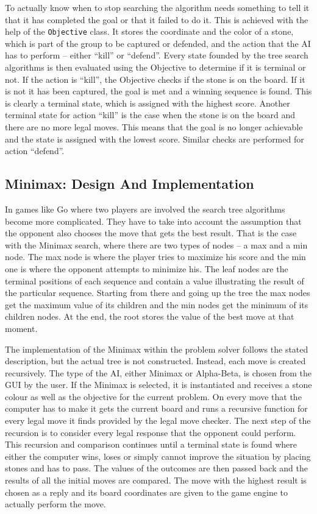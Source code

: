 \documentclass{l3proj}
\begin{document}
To actually know when to stop searching the algorithm needs something to tell it that it has completed the goal or that it failed to do it. This is achieved with the help of the \texttt{Objective} class. It stores the coordinate and the color of a stone, which is part of the group to be captured or defended, and the action that the AI has to perform – either “kill” or “defend”. Every state founded by the tree search algorithms is then evaluated using the Objective to determine if it is terminal or not. If the action is “kill”, the Objective checks if the stone is on the board. If it is not it has been captured, the goal is met and a winning sequence is found. This is clearly a terminal state, which is assigned with the highest score. Another terminal state for action “kill” is the case when the stone is on the board and there are no more legal moves. This means that the goal is no longer achievable and the state is assigned with the lowest score. Similar checks are performed for action “defend”.

\subsection{Minimax: Design And Implementation}

In games like Go where two players are involved the search tree algorithms become more complicated. They have to take into account the assumption that the opponent also chooses the move that gets the best result. That is the case with the Minimax search, where there are two types of nodes – a max and a min node. The max node is where the player tries to maximize his score and the min one is where the opponent attempts to minimize his. The leaf nodes are the terminal positions of each sequence and contain a value illustrating the result of the particular sequence. Starting from there and going up the tree the max nodes get the maximum value of its children and the min nodes get the minimum of its children nodes. At the end, the root stores the value of the best move at that moment.  

The implementation of the Minimax within the problem solver follows the stated description, but the actual tree is not constructed. Instead, each move is created recursively. The type of the AI, either Minimax or Alpha-Beta, is chosen from the GUI by the user. If the Minimax is selected, it is instantiated and receives a stone colour as well as the objective for the current problem. On every move that the computer has to make it gets the current board and runs a recursive function for every legal move it finds provided by the legal move checker. The next step of the recursion is to consider every legal response that the opponent could perform. This recursion and comparison continues until a terminal state is found where either the computer wins, loses or simply cannot improve the situation by placing stones and has to pass. The values of the outcomes are then passed back and the results of all the initial moves are compared. The move with the highest result is chosen as a reply and its board coordinates are given to the game engine to actually perform the move.
\end{document}
